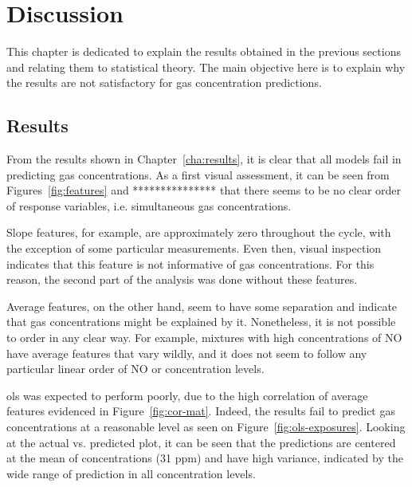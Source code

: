 
\chapter{Discussion}
\label{cha:discussion}

This chapter is dedicated to explain the results obtained in the previous sections and relating them to statistical theory. The main objective here is to explain why the results are not satisfactory for gas concentration predictions.

\section{Results}
\label{sec:discussion-results}

From the results shown in Chapter~\ref{cha:results}, it is clear that all models fail in predicting gas concentrations. As a first visual assessment, it can be seen from Figures~\ref{fig:features} and *************** that there seems to be no clear order of response variables, i.e. simultaneous gas concentrations.

 Slope features, for example, are approximately zero throughout the cycle, with the exception of some particular measurements. Even then, visual inspection indicates that this feature is not informative of gas concentrations. For this reason, the second part of the analysis was done without these features.
 
 Average features, on the other hand, seem to have some separation and indicate that gas concentrations might be explained by it. Nonetheless, it is not possible to order in any clear way. For example, mixtures with high concentrations of NO have average features that vary wildly, and it does not seem to follow any particular linear order of NO or \nox concentration levels. 
 
\acrlong{ols} was expected to perform poorly, due to the high correlation of average features evidenced in Figure~\ref{fig:cor-mat}. Indeed, the results fail to predict gas concentrations at a reasonable level as seen on Figure~\ref{fig:ols-exposures}. Looking at the actual vs. predicted plot, it can be seen that the predictions are centered at the mean of concentrations (31 ppm) and have high variance, indicated by the wide range of prediction in all concentration levels.

